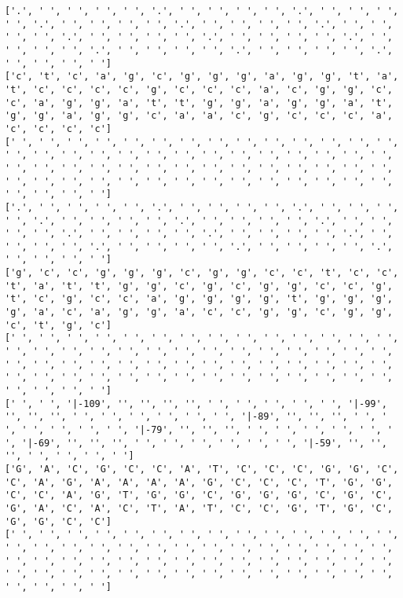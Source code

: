 \documentclass{article}
\begin{document}
\begin{Verbatim}
['.', ' ', ' ', ' ', ' ', '.', ' ', ' ', ' ', ' ', '.', ' ', ' ', ' ', ' ', '.', ' ', ' ', ' ', ' ', '.', ' ', ' ', ' ', ' ', '.', ' ', ' ', ' ', ' ', '.', ' ', ' ', ' ', ' ', '.', ' ', ' ', ' ', ' ', '.', ' ', ' ', ' ', ' ', '.', ' ', ' ', ' ', ' ', '.', ' ', ' ', ' ', ' ', '.', ' ', ' ', ' ', ' ']
['c', 't', 'c', 'a', 'g', 'c', 'g', 'g', 'g', 'a', 'g', 'g', 't', 'a', 't', 'c', 'c', 'c', 'c', 'g', 'c', 'c', 'c', 'a', 'c', 'g', 'g', 'c', 'c', 'a', 'g', 'g', 'a', 't', 't', 'g', 'g', 'a', 'g', 'g', 'a', 't', 'g', 'g', 'a', 'g', 'g', 'c', 'a', 'a', 'c', 'g', 'c', 'c', 'c', 'a', 'c', 'c', 'c', 'c']
[' ', ' ', ' ', ' ', ' ', ' ', ' ', ' ', ' ', ' ', ' ', ' ', ' ', ' ', ' ', ' ', ' ', ' ', ' ', ' ', ' ', ' ', ' ', ' ', ' ', ' ', ' ', ' ', ' ', ' ', ' ', ' ', ' ', ' ', ' ', ' ', ' ', ' ', ' ', ' ', ' ', ' ', ' ', ' ', ' ', ' ', ' ', ' ', ' ', ' ', ' ', ' ', ' ', ' ', ' ', ' ', ' ', ' ', ' ', ' ']
['.', ' ', ' ', ' ', ' ', '.', ' ', ' ', ' ', ' ', '.', ' ', ' ', ' ', ' ', '.', ' ', ' ', ' ', ' ', '.', ' ', ' ', ' ', ' ', '.', ' ', ' ', ' ', ' ', '.', ' ', ' ', ' ', ' ', '.', ' ', ' ', ' ', ' ', '.', ' ', ' ', ' ', ' ', '.', ' ', ' ', ' ', ' ', '.', ' ', ' ', ' ', ' ', '.', ' ', ' ', ' ', ' ']
['g', 'c', 'c', 'g', 'g', 'g', 'c', 'g', 'g', 'c', 'c', 't', 'c', 'c', 't', 'a', 't', 't', 'g', 'g', 'c', 'g', 'c', 'g', 'g', 'c', 'c', 'g', 't', 'c', 'g', 'c', 'c', 'a', 'g', 'g', 'g', 'g', 't', 'g', 'g', 'g', 'g', 'a', 'c', 'a', 'g', 'g', 'a', 'c', 'c', 'g', 'g', 'c', 'g', 'g', 'c', 't', 'g', 'c']
[' ', ' ', ' ', ' ', ' ', ' ', ' ', ' ', ' ', ' ', ' ', ' ', ' ', ' ', ' ', ' ', ' ', ' ', ' ', ' ', ' ', ' ', ' ', ' ', ' ', ' ', ' ', ' ', ' ', ' ', ' ', ' ', ' ', ' ', ' ', ' ', ' ', ' ', ' ', ' ', ' ', ' ', ' ', ' ', ' ', ' ', ' ', ' ', ' ', ' ', ' ', ' ', ' ', ' ', ' ', ' ', ' ', ' ', ' ', ' ']
[' ', ' ', '|-109', '', '', '', '', ' ', ' ', ' ', ' ', ' ', '|-99', '', '', '', ' ', ' ', ' ', ' ', ' ', ' ', '|-89', '', '', '', ' ', ' ', ' ', ' ', ' ', ' ', '|-79', '', '', '', ' ', ' ', ' ', ' ', ' ', ' ', '|-69', '', '', '', ' ', ' ', ' ', ' ', ' ', ' ', '|-59', '', '', '', ' ', ' ', ' ', ' ']
['G', 'A', 'C', 'G', 'C', 'C', 'A', 'T', 'C', 'C', 'C', 'G', 'G', 'C', 'C', 'A', 'G', 'A', 'A', 'A', 'A', 'G', 'C', 'C', 'C', 'T', 'G', 'G', 'C', 'C', 'A', 'G', 'T', 'G', 'G', 'C', 'G', 'G', 'G', 'C', 'G', 'C', 'G', 'A', 'C', 'A', 'C', 'T', 'A', 'T', 'C', 'C', 'G', 'T', 'G', 'C', 'G', 'G', 'C', 'C']
[' ', ' ', ' ', ' ', ' ', ' ', ' ', ' ', ' ', ' ', ' ', ' ', ' ', ' ', ' ', ' ', ' ', ' ', ' ', ' ', ' ', ' ', ' ', ' ', ' ', ' ', ' ', ' ', ' ', ' ', ' ', ' ', ' ', ' ', ' ', ' ', ' ', ' ', ' ', ' ', ' ', ' ', ' ', ' ', ' ', ' ', ' ', ' ', ' ', ' ', ' ', ' ', ' ', ' ', ' ', ' ', ' ', ' ', ' ', ' ']

\end{Verbatim}
\end{document}
